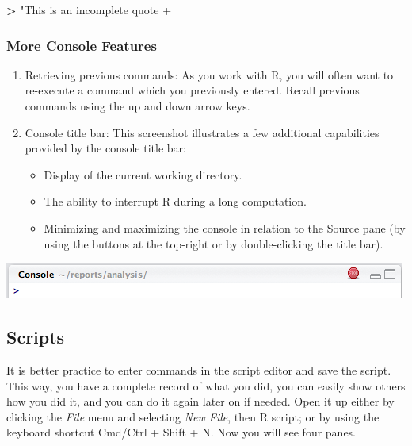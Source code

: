\documentclass[
]{book}
\newenvironment{Shaded}{\begin{snugshade}}{\end{snugshade}}
\newcommand{\OperatorTok}[1]{\textcolor[rgb]{0.81,0.36,0.00}{\textbf{#1}}}
\newcommand{\StringTok}[1]{\textcolor[rgb]{0.31,0.60,0.02}{#1}}
\providecommand{\tightlist}{%
  \setlength{\itemsep}{0pt}\setlength{\parskip}{0pt}}
\begin{document}
\begin{Shaded}
\begin{Highlighting}[]
\OperatorTok{>}\StringTok{ "This is an incomplete quote}
\StringTok{+}
\end{Highlighting}
\end{Shaded}

\hypertarget{more-console-features}{%
\subsubsection*{More Console Features}\label{more-console-features}}

\begin{enumerate}
\def\labelenumi{\arabic{enumi}.}
\item
  Retrieving previous commands: As you work with R, you will often want to re-execute a command which you previously entered. Recall previous commands using the up and down arrow keys.
\item
  Console title bar: This screenshot illustrates a few additional capabilities provided by the console title bar:

  \begin{itemize}
  \tightlist
  \item
    Display of the current working directory.
  \item
    The ability to interrupt R during a long computation.
  \item
    Minimizing and maximizing the console in relation to the Source pane (by using the buttons at the top-right or by double-clicking the title bar).
  \end{itemize}
\end{enumerate}

\begin{center}\includegraphics[width=0.7\linewidth]{img/using_console_title_bar} \end{center}

\hypertarget{scripts}{%
\subsection{Scripts}\label{scripts}}

It is better practice to enter commands in the script editor and save the script. This way, you have a complete record of what you did, you can easily show others how you did it, and you can do it again later on if needed. Open it up either by clicking the \emph{File} menu and selecting \emph{New File}, then R script; or by using the keyboard shortcut Cmd/Ctrl + Shift + N. Now you will see four panes.
\end{document}
